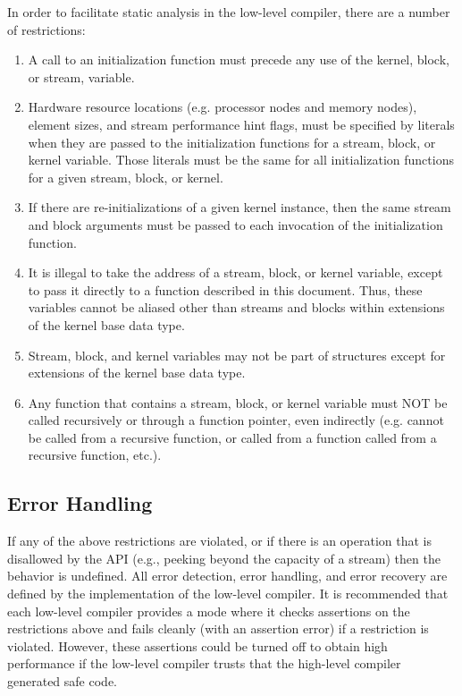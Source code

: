 In order to facilitate static analysis in the low-level compiler,
there are a number of restrictions:

\begin{enumerate}

\item A call to an initialization function must precede any use of the kernel, block, or stream, variable.

\item Hardware resource locations (e.g. processor nodes and memory
nodes), element sizes, and stream performance hint flags, must be
specified by literals when they are passed to the initialization
functions for a stream, block, or kernel variable. Those literals must
be the same for all initialization functions for a given stream,
block, or kernel.

\item If there are re-initializations of a given kernel instance, then
the same stream and block arguments must be passed to each invocation
of the initialization function.

\item It is illegal to take the address of a stream, block, or kernel
variable, except to pass it directly to a function described in this
document. Thus, these variables cannot be aliased other than streams
and blocks within extensions of the kernel base data type.

\item Stream, block, and kernel variables may not be part of
structures except for extensions of the kernel base data type.

\item Any function that contains a stream, block, or kernel variable
must NOT be called recursively or through a function pointer, even
indirectly (e.g. cannot be called from a recursive function, or called
from a function called from a recursive function, etc.).

\end{enumerate}

\subsection{Error Handling}

If any of the above restrictions are violated, or if there is an
operation that is disallowed by the API (e.g., peeking beyond the
capacity of a stream) then the behavior is undefined.  All error
detection, error handling, and error recovery are defined by the
implementation of the low-level compiler.  It is recommended that each
low-level compiler provides a mode where it checks assertions on the
restrictions above and fails cleanly (with an assertion error) if a
restriction is violated.  However, these assertions could be turned
off to obtain high performance if the low-level compiler trusts that
the high-level compiler generated safe code.

